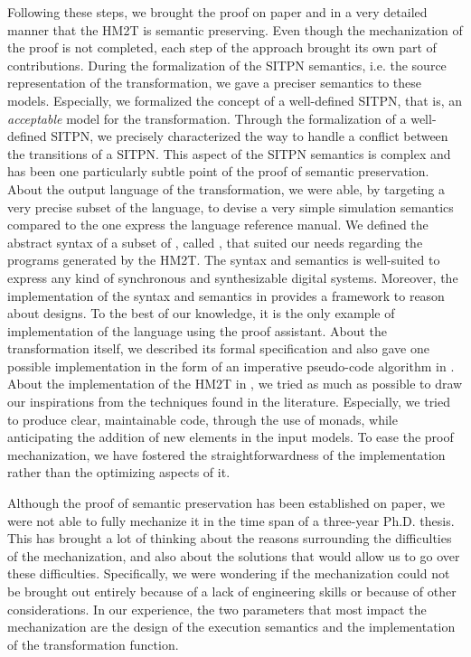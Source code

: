\documentclass[pdflatex,sn-mathphys]{sn-jnl}%
\theoremstyle{thmstyleone}%
\theoremstyle{thmstyletwo}%
\theoremstyle{thmstylethree}%
\begin{document}
Following these steps, we brought the proof on paper and in a very
detailed manner that the HM2T is semantic preserving. Even though the
mechanization of the proof is not completed, each step of the approach
brought its own part of contributions.  During the formalization of
the SITPN semantics, i.e. the source representation of the
transformation, we gave a preciser semantics to these
models. Especially, we formalized the concept of a well-defined SITPN,
that is, an \textit{acceptable} model for the
transformation. %
Through the formalization of a well-defined SITPN, we precisely
characterized the way to handle a conflict between the transitions of
a SITPN. This aspect of the SITPN semantics is complex and has been
one particularly subtle point of the proof of semantic preservation.
About the output language of the transformation, we were able, by
targeting a very precise subset of the \vhdl{} language, to devise a
very simple simulation semantics compared to the one express the
language reference manual. We defined the abstract syntax of a subset
of \vhdl{}, called \hvhdl{}, that suited our needs regarding the
\vhdl{} programs generated by the HM2T. The \hvhdl{} syntax and
semantics is well-suited to express any kind of synchronous and
synthesizable digital systems. Moreover, the implementation of the
\hvhdl{} syntax and semantics in \coq{} provides a framework to reason
about \hvhdl{} designs. To the best of our knowledge, it is the only
example of implementation of the \vhdl{} language using the \coq{}
proof assistant. About the transformation itself, we described its
formal specification and also gave one possible implementation in the
form of an imperative pseudo-code algorithm in
\cite{Iampietro2021}. About the implementation of the HM2T in \coq{},
we tried as much as possible to draw our inspirations from the
techniques found in the literature. Especially, we tried to produce
clear, maintainable code, through the use of monads, while
anticipating the addition of new elements in the input models.  To
ease the proof mechanization, we have fostered the straightforwardness
of the implementation rather than the optimizing aspects of it.

\bigskip


Although the proof of semantic preservation has been established on
paper, we were not able to fully mechanize it in the time span of a
three-year Ph.D. thesis. This has brought a lot of thinking about the
reasons surrounding the difficulties of the mechanization, and also
about the solutions that would allow us to go over these
difficulties. Specifically, we were wondering if the mechanization
could not be brought out entirely because of a lack of engineering
skills or because of other considerations. In our experience, the two
parameters that most impact the mechanization are the design of the
execution semantics and the implementation of the transformation
function.
\end{document}
